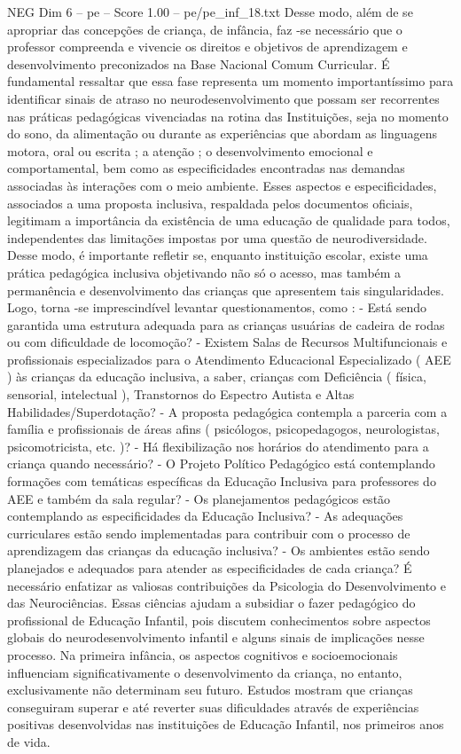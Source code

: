 \begin{textsample}{NEG Dim 6 – pe – Score 1.00 – pe/pe\_inf\_18.txt}
Desse modo, além de se apropriar das concepções de criança, de infância, faz -se necessário que o professor compreenda e vivencie os direitos e objetivos de aprendizagem e desenvolvimento preconizados na Base Nacional Comum Curricular.
É fundamental ressaltar que essa fase representa um momento importantíssimo para identificar sinais de atraso no neurodesenvolvimento que possam ser recorrentes nas práticas pedagógicas vivenciadas na rotina das Instituições, seja no momento do sono, da alimentação ou durante as experiências que abordam as linguagens motora, oral ou escrita ; a atenção ; o desenvolvimento emocional e comportamental, bem como as especificidades encontradas nas demandas associadas às interações com o meio ambiente.
Esses aspectos e especificidades, associados a uma proposta inclusiva, respaldada pelos documentos oficiais, legitimam a importância da existência de uma educação de qualidade para todos, independentes das limitações impostas por uma questão de neurodiversidade.
Desse modo, é importante refletir se, enquanto instituição escolar, existe uma prática pedagógica inclusiva objetivando não só o acesso, mas também a permanência e desenvolvimento das crianças que apresentem tais singularidades.
Logo, torna -se imprescindível levantar questionamentos, como : - Está sendo garantida uma estrutura adequada para as crianças usuárias de cadeira de rodas ou com dificuldade de locomoção? - Existem Salas de Recursos Multifuncionais e profissionais especializados para o Atendimento Educacional Especializado ( AEE ) às crianças da educação inclusiva, a saber, crianças com Deficiência ( física, sensorial, intelectual ), Transtornos do Espectro Autista e Altas Habilidades/Superdotação? - A proposta pedagógica contempla a parceria com a família e profissionais de áreas afins ( psicólogos, psicopedagogos, neurologistas, psicomotricista, etc. )? - Há flexibilização nos horários do atendimento para a criança quando necessário? - O Projeto Político Pedagógico está contemplando formações com temáticas específicas da Educação Inclusiva para professores do AEE e também da sala regular? - Os planejamentos pedagógicos estão contemplando as especificidades da Educação Inclusiva? - As adequações curriculares estão sendo implementadas para contribuir com o processo de aprendizagem das crianças da educação inclusiva? - Os ambientes estão sendo planejados e adequados para atender as especificidades de cada criança?
É necessário enfatizar as valiosas contribuições da Psicologia do Desenvolvimento e das Neurociências.
Essas ciências ajudam a subsidiar o fazer pedagógico do profissional de Educação Infantil, pois discutem conhecimentos sobre aspectos globais do neurodesenvolvimento infantil e alguns sinais de implicações nesse processo.
Na primeira infância, os aspectos cognitivos e socioemocionais influenciam significativamente o desenvolvimento da criança, no entanto, exclusivamente não determinam seu futuro.
Estudos mostram que crianças conseguiram superar e até reverter suas dificuldades através de experiências positivas desenvolvidas nas instituições de Educação Infantil, nos primeiros anos de vida.

\end{textsample}
